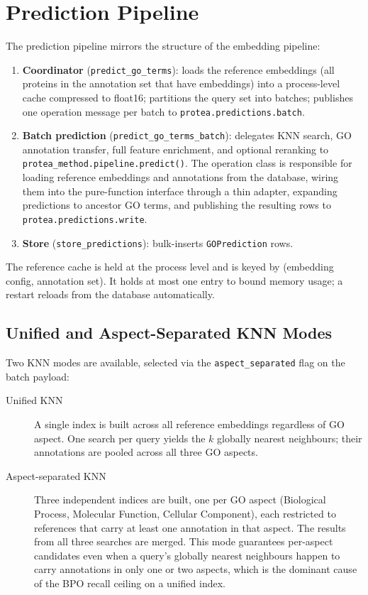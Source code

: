 \section{Prediction Pipeline}
\label{sec:prediction-pipeline}

The prediction pipeline mirrors the structure of the embedding pipeline:

\begin{enumerate}
  \item \textbf{Coordinator} (\texttt{predict\_go\_terms}): loads the reference
    embeddings (all proteins in the annotation set that have embeddings) into
    a process-level cache compressed to float16; partitions the query set into
    batches; publishes one operation message per batch to
    \texttt{protea.predictions.batch}.
  \item \textbf{Batch prediction} (\texttt{predict\_go\_terms\_batch}): delegates
    KNN search, GO annotation transfer, full feature enrichment, and optional
    reranking to \texttt{protea\_method.pipeline.predict()}. The operation class
    is responsible for loading reference embeddings and annotations from the
    database, wiring them into the pure-function interface through a thin
    adapter, expanding predictions to ancestor GO terms, and publishing the
    resulting rows to \texttt{protea.predictions.write}.
  \item \textbf{Store} (\texttt{store\_predictions}): bulk-inserts
    \texttt{GOPrediction} rows.
\end{enumerate}

The reference cache is held at the process level and is keyed by
(embedding config, annotation set). It holds at most one entry to bound memory
usage; a restart reloads from the database automatically.

\subsection{Unified and Aspect-Separated KNN Modes}
\label{subsec:knn-modes}

Two KNN modes are available, selected via the \texttt{aspect\_separated} flag
on the batch payload:

\begin{description}
  \item[Unified KNN] A single index is built across all reference embeddings
    regardless of GO aspect. One search per query yields the $k$ globally
    nearest neighbours; their annotations are pooled across all three GO
    aspects.
  \item[Aspect-separated KNN] Three independent indices are built, one per
    GO aspect (Biological Process, Molecular Function, Cellular Component),
    each restricted to references that carry at least one annotation in that
    aspect. The results from all three searches are merged. This mode
    guarantees per-aspect candidates even when a query's globally nearest
    neighbours happen to carry annotations in only one or two aspects, which
    is the dominant cause of the BPO recall ceiling on a unified index.
\end{description}

